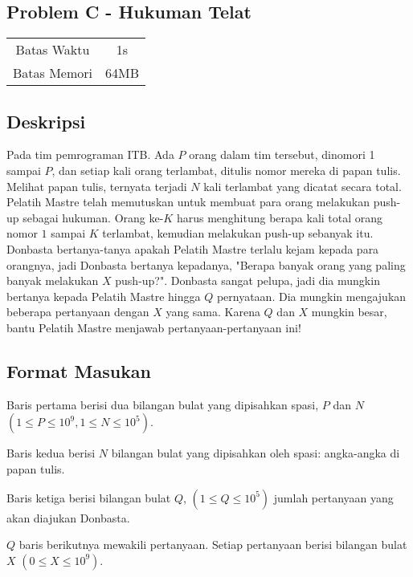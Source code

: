 \documentclass{article}
\begin{document}
\begin{center}
    \section*{Problem C - Hukuman Telat} %
    \begin{tabular}{ | c c | }
        \hline
        Batas Waktu  & 1s \\    %
        Batas Memori & 64MB \\  %
        \hline
    \end{tabular}
\end{center}

\subsection*{Deskripsi}

Pada tim pemrograman ITB. Ada $P$ orang dalam tim tersebut, dinomori 1 sampai $P$, dan setiap kali orang terlambat, ditulis nomor mereka di papan tulis. Melihat papan tulis, ternyata terjadi $N$ kali terlambat yang dicatat secara total. Pelatih Mastre telah memutuskan untuk membuat para orang melakukan push-up sebagai hukuman. Orang ke-$K$ harus menghitung berapa kali total orang nomor $1$ sampai $K$ terlambat, kemudian melakukan push-up sebanyak itu. Donbasta bertanya-tanya apakah Pelatih Mastre terlalu kejam kepada para orangnya, jadi Donbasta bertanya kepadanya, "Berapa banyak orang yang paling banyak melakukan $X$ push-up?". Donbasta sangat pelupa, jadi dia mungkin bertanya kepada Pelatih Mastre hingga $Q$ pernyataan. Dia mungkin mengajukan beberapa pertanyaan dengan $X$ yang sama. Karena $Q$ dan $X$ mungkin besar, bantu Pelatih Mastre menjawab pertanyaan-pertanyaan ini!

\subsection*{Format Masukan}

Baris pertama berisi dua bilangan bulat yang dipisahkan spasi, $P$ dan $N$ $(1 \leq P \leq 10^9,  1 \leq N \leq 10^5)$.

Baris kedua berisi $N$ bilangan bulat yang dipisahkan oleh spasi: angka-angka di papan tulis.

Baris ketiga berisi bilangan bulat $Q$, $(1 \leq Q \leq 10^5)$ jumlah pertanyaan yang akan diajukan Donbasta.

$Q$ baris berikutnya mewakili pertanyaan. Setiap pertanyaan berisi bilangan bulat $X$  $(0 \leq X \leq 10^9)$.
\end{document}
